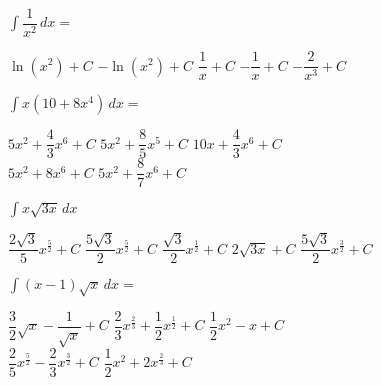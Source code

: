 \begin{questions}
    \question $\int \dfrac{1}{x^2} \, dx = $ \\

    \begin{oneparchoices}
        \choice $\ln \left(x^2\right) + C$
        \choice $-\ln \left(x^2\right) + C$
        \choice $\dfrac{1}{x} + C$
        \choice $-\dfrac{1}{x} + C$
        \choice $-\dfrac{2}{x^3} + C$
    \end{oneparchoices} \par \horizontalline

    \question $\int x\left(10 + 8x^4\right) \, dx = $ \\

    \begin{oneparchoices}
        \choice $5x^2 + \dfrac{4}{3}x^6 + C$ 
        \choice $5x^2 + \dfrac{8}{5}x^5 + C$
        \choice $10x + \dfrac{4}{3}x^6 + C$ \\[11pt]
        \makebox[0.22 \textwidth] \choice $5x^2 + 8x^6 + C$ 
        \makebox[0.24 \textwidth] \choice $5x^2 + \dfrac{8}{7}x^6 + C$
    \end{oneparchoices} \par \horizontalline

    \question $\int x\sqrt{3x} \, dx$ \\

    \begin{oneparchoices}
        \choice $\dfrac{2\sqrt{3}}{5}x^{\frac{5}{2}} + C$ 
        \choice $\dfrac{5\sqrt{3}}{2}x^{\frac{5}{2}} + C$ 
        \choice $\dfrac{\sqrt{3}}{2}x^{\frac{1}{2}} + C$ 
        \choice $2\sqrt{3x} + C$
        \choice $\dfrac{5\sqrt{3}}{2}x^{\frac{3}{2}} + C$ 
    \end{oneparchoices} \par \horizontalline

    \question $\int (x - 1)\sqrt{x} \, dx = $ \\

    \begin{oneparchoices}
        \choice $\dfrac{3}{2}\sqrt{x} - \dfrac{1}{\sqrt{x}} + C$
        \choice $\dfrac{2}{3}x^{\frac{2}{3}} + \dfrac{1}{2}x^{\frac{1}{2}} + C$
        \choice $\dfrac{1}{2}x^2 - x + C$ \\[11pt]
        \makebox[0.24\textwidth] \choice $\dfrac{2}{5}x^{\frac{5}{2}} - \dfrac{2}{3}x^{\frac{3}{2}} + C$
        \makebox[0.22\textwidth] \choice $\dfrac{1}{2}x^2 + 2x^{\frac{2}{3}} + C$
    \end{oneparchoices} \par \horizontalline


\end{questions}
